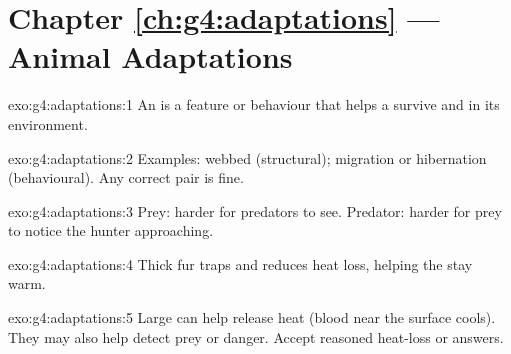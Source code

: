\section*{Chapter \ref{ch:g4:adaptations} --- Animal Adaptations}

\begin{solution}{exo:g4:adaptations:1}
An  is a  feature or behaviour that helps a 
survive and  in its environment.
\end{solution}

\begin{solution}{exo:g4:adaptations:2}
Examples: webbed  (structural); migration or hibernation
(behavioural). Any correct pair is fine.
\end{solution}

\begin{solution}{exo:g4:adaptations:3}
Prey: harder for predators to see. Predator: harder for prey to notice
the hunter approaching.
\end{solution}

\begin{solution}{exo:g4:adaptations:4}
Thick fur traps  and reduces heat loss, helping the  stay warm.
\end{solution}

\begin{solution}{exo:g4:adaptations:5}
Large  can help release heat (blood near the surface cools). They
may also help detect prey or danger. Accept reasoned heat-loss or
 answers.
\end{solution}

